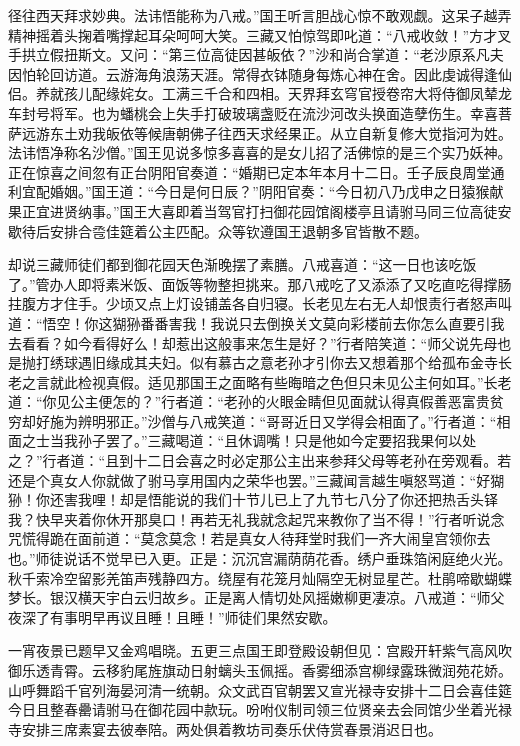 \documentclass[12pt,UTF8]{ctexbook}
\begin{document}
{	径往西天拜求妙典。法讳悟能称为八戒。”国王听言胆战心惊不敢观觑。这呆子越弄精神摇着头掬着嘴撑起耳朵呵呵大笑。三藏又怕惊驾即叱道：“八戒收敛！”方才叉手拱立假扭斯文。又问：“第三位高徒因甚皈依？”沙和尚合掌道：“老沙原系凡夫因怕轮回访道。云游海角浪荡天涯。常得衣钵随身每炼心神在舍。因此虔诚得逢仙侣。养就孩儿配缘姹女。工满三千合和四相。天界拜玄穹官授卷帘大将侍御凤辇龙车封号将军。也为蟠桃会上失手打破玻璃盏贬在流沙河改头换面造孽伤生。幸喜菩萨远游东土劝我皈依等候唐朝佛子往西天求经果正。从立自新复修大觉指河为姓。法讳悟净称名沙僧。”国王见说多惊多喜喜的是女儿招了活佛惊的是三个实乃妖神。正在惊喜之间忽有正台阴阳官奏道：“婚期已定本年本月十二日。壬子辰良周堂通利宜配婚姻。”国王道：“今日是何日辰？”阴阳官奏：“今日初八乃戊申之日猿猴献果正宜进贤纳事。”国王大喜即着当驾官打扫御花园馆阁楼亭且请驸马同三位高徒安歇待后安排合卺佳筵着公主匹配。众等钦遵国王退朝多官皆散不题。
	
	却说三藏师徒们都到御花园天色渐晚摆了素膳。八戒喜道：“这一日也该吃饭了。”管办人即将素米饭、面饭等物整担挑来。那八戒吃了又添添了又吃直吃得撑肠拄腹方才住手。少顷又点上灯设铺盖各自归寝。长老见左右无人却恨责行者怒声叫道：“悟空！你这猢狲番番害我！我说只去倒换关文莫向彩楼前去你怎么直要引我去看看？如今看得好么！却惹出这般事来怎生是好？”行者陪笑道：“师父说先母也是抛打绣球遇旧缘成其夫妇。似有慕古之意老孙才引你去又想着那个给孤布金寺长老之言就此检视真假。适见那国王之面略有些晦暗之色但只未见公主何如耳。”长老道：“你见公主便怎的？”行者道：“老孙的火眼金睛但见面就认得真假善恶富贵贫穷却好施为辨明邪正。”沙僧与八戒笑道：“哥哥近日又学得会相面了。”行者道：“相面之士当我孙子罢了。”三藏喝道：“且休调嘴！只是他如今定要招我果何以处之？”行者道：“且到十二日会喜之时必定那公主出来参拜父母等老孙在旁观看。若还是个真女人你就做了驸马享用国内之荣华也罢。”三藏闻言越生嗔怒骂道：“好猢狲！你还害我哩！却是悟能说的我们十节儿已上了九节七八分了你还把热舌头铎我？快早夹着你休开那臭口！再若无礼我就念起咒来教你了当不得！”行者听说念咒慌得跪在面前道：“莫念莫念！若是真女人待拜堂时我们一齐大闹皇宫领你去也。”师徒说话不觉早已入更。正是：沉沉宫漏荫荫花香。绣户垂珠箔闲庭绝火光。秋千索冷空留影羌笛声残静四方。绕屋有花笼月灿隔空无树显星芒。杜鹃啼歇蝴蝶梦长。银汉横天宇白云归故乡。正是离人情切处风摇嫩柳更凄凉。八戒道：“师父夜深了有事明早再议且睡！且睡！”师徒们果然安歇。
	
	一宵夜景已题早又金鸡唱晓。五更三点国王即登殿设朝但见：宫殿开轩紫气高风吹御乐透青霄。云移豹尾旌旗动日射螭头玉佩摇。香雾细添宫柳绿露珠微润苑花娇。山呼舞蹈千官列海晏河清一统朝。众文武百官朝罢又宣光禄寺安排十二日会喜佳筵今日且整春罍请驸马在御花园中款玩。吩咐仪制司领三位贤亲去会同馆少坐着光禄寺安排三席素宴去彼奉陪。两处俱着教坊司奏乐伏侍赏春景消迟日也。
	
}
\end{document}
